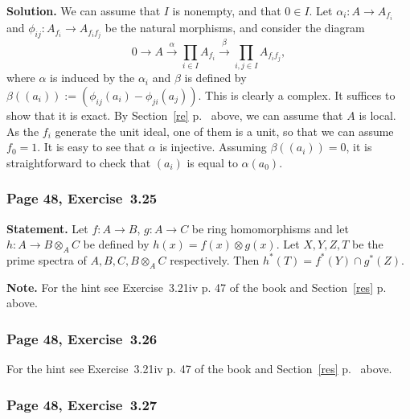\documentclass[12pt,letterpaper]{article}%
\newcommand{\mf}{\mathfrak}
\newcommand{\ppp}{\mf p}
\newcommand{\xr}{\xrightarrow}
\newcommand{\nn}{\noindent}
\begin{document}
\nn\textbf{Solution.} We can assume that $I$ is nonempty, and that $0\in I$. Let $\alpha_i:A\to A_{f_i}$ and $\phi_{ij}:A_{f_i}\to A_{f_if_j}$ be the natural morphisms, and consider the diagram 
$$
0\to A\xr\alpha\prod_{i\in I}A_{f_i}\xr\beta\prod_{i,j\in I}A_{f_if_j},
$$ 
where $\alpha$ is induced by the $\alpha_i$ and $\beta$ is defined by $\beta((a_i)):=(\phi_{ij}(a_i)-\phi_{ji}(a_j))$. This is clearly a complex. It suffices to show that it is exact. By Section~\ref{re} p.~\pageref{re} above, we can assume that $A$ is local. As the $f_i$ generate the unit ideal, one of them is a unit, so that we can assume $f_0=1$. It is easy to see that $\alpha$ is injective. Assuming $\beta((a_i))=0$, it is straightforward to check that $(a_i)$ is equal to $\alpha(a_0)$.%

\subsubsection{Page 48, Exercise~3.25}%

\textbf{Statement.} Let $f:A\to B$, $g:A\to C$ be ring homomorphisms and let $h:A\to B\otimes_AC$ be defined by $h(x)=f(x)\otimes g(x)$. Let $X,Y,Z,T$ be the prime spectra of $A,B,C,B\otimes_AC$ respectively. Then $h^*(T)=f^*(Y)\cap g^*(Z)$.

\nn[Let $\ppp\in X$, and let $k=k(\ppp)$ be the residue field at $\ppp$. By Exercise~21, the fiber $h^{*-1}(\ppp)$ is the spectrum of $(B\otimes_AC)\otimes_Ak\simeq(B\otimes_Ak)\otimes_k(C\otimes_Ak)$. Hence 
$$
\ppp\in h^*(T)\iff(B\otimes_Ak)\otimes(C\otimes_Ak)\ne0\iff B\otimes_Ak\ne0
$$ 
and $C\otimes_Ak\ne0\iff\ppp\in f^*(Y)\cap g^*(Z)$.]

\nn\textbf{Note.} For the hint see Exercise~3.21iv p. 47 of the book and Section~\ref{res} p.~\pageref{res} above.

\subsubsection{Page 48, Exercise~3.26}%

For the hint see Exercise~3.21iv p. 47 of the book and Section~\ref{res} p.~\pageref{res} above.

\subsubsection{Page 48, Exercise~3.27}%
\end{document}
